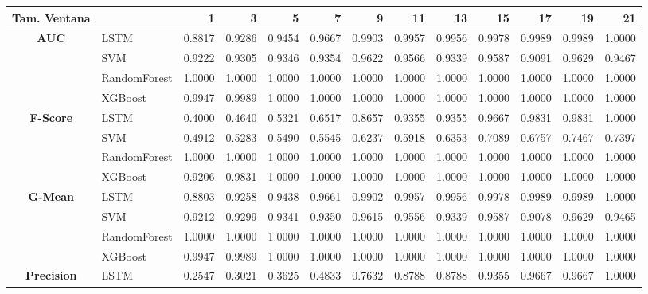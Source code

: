 \begin{table}[h]
	\centering
	\begin{adjustbox}{max width=15cm}
		\begin{tabular}{|c|l|r|r|r|r|r|r|r|r|r|r|r|}
			\hline
			\textbf{Tam. Ventana}&         &      1  &      3  &      5  &      7  &      9  &      11 &      13 &      15 &      17 &      19 &      21 \\
			\hline
			\textbf{AUC} & LSTM &  0.8817 &  0.9286 &  0.9454 &  0.9667 &  0.9903 &  0.9957 &  0.9956 &  0.9978 &  0.9989 &  0.9989 &  1.0000 \\
			& SVM &  0.9222 &  0.9305 &  0.9346 &  0.9354 &  0.9622 &  0.9566 &  0.9339 &  0.9587 &  0.9091 &  0.9629 &  0.9467 \\
			& RandomForest &  1.0000 &  1.0000 &  1.0000 &  1.0000 &  1.0000 &  1.0000 &  1.0000 &  1.0000 &  1.0000 &  1.0000 &  1.0000 \\
			& XGBoost &  0.9947 &  0.9989 &  1.0000 &  1.0000 &  1.0000 &  1.0000 &  1.0000 &  1.0000 &  1.0000 &  1.0000 &  1.0000 \\
			\hline
			\textbf{F-Score} & LSTM &  0.4000 &  0.4640 &  0.5321 &  0.6517 &  0.8657 &  0.9355 &  0.9355 &  0.9667 &  0.9831 &  0.9831 &  1.0000 \\
			& SVM &  0.4912 &  0.5283 &  0.5490 &  0.5545 &  0.6237 &  0.5918 &  0.6353 &  0.7089 &  0.6757 &  0.7467 &  0.7397 \\
			& RandomForest &  1.0000 &  1.0000 &  1.0000 &  1.0000 &  1.0000 &  1.0000 &  1.0000 &  1.0000 &  1.0000 &  1.0000 &  1.0000 \\
			& XGBoost &  0.9206 &  0.9831 &  1.0000 &  1.0000 &  1.0000 &  1.0000 &  1.0000 &  1.0000 &  1.0000 &  1.0000 &  1.0000 \\
			\hline
			\textbf{G-Mean} & LSTM &  0.8803 &  0.9258 &  0.9438 &  0.9661 &  0.9902 &  0.9957 &  0.9956 &  0.9978 &  0.9989 &  0.9989 &  1.0000 \\
			& SVM &  0.9212 &  0.9299 &  0.9341 &  0.9350 &  0.9615 &  0.9556 &  0.9339 &  0.9587 &  0.9078 &  0.9629 &  0.9465 \\
			& RandomForest &  1.0000 &  1.0000 &  1.0000 &  1.0000 &  1.0000 &  1.0000 &  1.0000 &  1.0000 &  1.0000 &  1.0000 &  1.0000 \\
			& XGBoost &  0.9947 &  0.9989 &  1.0000 &  1.0000 &  1.0000 &  1.0000 &  1.0000 &  1.0000 &  1.0000 &  1.0000 &  1.0000 \\
			\hline
			\textbf{Precision} & LSTM &  0.2547 &  0.3021 &  0.3625 &  0.4833 &  0.7632 &  0.8788 &  0.8788 &  0.9355 &  0.9667 &  0.9667 &  1.0000 \\

\end{tabular}
\end{adjustbox}
\end{table}
